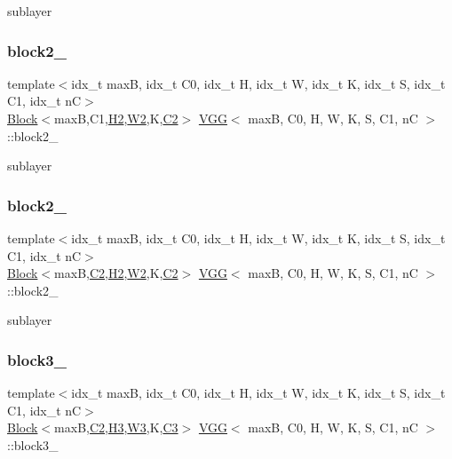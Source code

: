 sublayer \mbox{\label{structVGG_a29cfe2459ad162095c5d420d12448de3}} 
\subsubsection{\texorpdfstring{block2\+\_}{block2\_1}}
{\footnotesize\ttfamily template$<$idx\+\_\+t maxB, idx\+\_\+t C0, idx\+\_\+t H, idx\+\_\+t W, idx\+\_\+t K, idx\+\_\+t S, idx\+\_\+t C1, idx\+\_\+t nC$>$ \\
\hyperlink{structBlock}{Block}$<$maxB,C1,\hyperlink{structVGG_a6658da7d5fd275b2af6eb75511ba6f80}{H2},\hyperlink{structVGG_ac4a4d00b5e2ee41b1d4e8861bbc6c499}{W2},K,\hyperlink{structVGG_a1e9ad0d15e42696798d44b06ad3c9a9a}{C2}$>$ \hyperlink{structVGG}{V\+GG}$<$ maxB, C0, H, W, K, S, C1, nC $>$\+::block2\+\_}

sublayer \mbox{\label{structVGG_a421787324ebcaa4cc140c7eb588818df}} 
\subsubsection{\texorpdfstring{block2\+\_}{block2\_2}}
{\footnotesize\ttfamily template$<$idx\+\_\+t maxB, idx\+\_\+t C0, idx\+\_\+t H, idx\+\_\+t W, idx\+\_\+t K, idx\+\_\+t S, idx\+\_\+t C1, idx\+\_\+t nC$>$ \\
\hyperlink{structBlock}{Block}$<$maxB,\hyperlink{structVGG_a1e9ad0d15e42696798d44b06ad3c9a9a}{C2},\hyperlink{structVGG_a6658da7d5fd275b2af6eb75511ba6f80}{H2},\hyperlink{structVGG_ac4a4d00b5e2ee41b1d4e8861bbc6c499}{W2},K,\hyperlink{structVGG_a1e9ad0d15e42696798d44b06ad3c9a9a}{C2}$>$ \hyperlink{structVGG}{V\+GG}$<$ maxB, C0, H, W, K, S, C1, nC $>$\+::block2\+\_}

sublayer \mbox{\label{structVGG_a89a31b1def0a1fad5f76e2a33ddf1489}} 
\subsubsection{\texorpdfstring{block3\+\_}{block3\_1}}
{\footnotesize\ttfamily template$<$idx\+\_\+t maxB, idx\+\_\+t C0, idx\+\_\+t H, idx\+\_\+t W, idx\+\_\+t K, idx\+\_\+t S, idx\+\_\+t C1, idx\+\_\+t nC$>$ \\
\hyperlink{structBlock}{Block}$<$maxB,\hyperlink{structVGG_a1e9ad0d15e42696798d44b06ad3c9a9a}{C2},\hyperlink{structVGG_aad221438514d3b1a829d7f9c27a6f5ea}{H3},\hyperlink{structVGG_ad3bde49e961175621e0937584dae0af0}{W3},K,\hyperlink{structVGG_a88a35c950ca73035ad75644925c05061}{C3}$>$ \hyperlink{structVGG}{V\+GG}$<$ maxB, C0, H, W, K, S, C1, nC $>$\+::block3\+\_}


